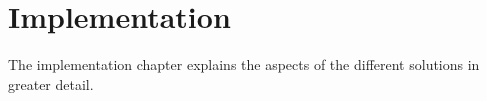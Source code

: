 \chapter{Implementation}\label{implementation}

The implementation chapter explains the aspects of the different solutions in greater detail.

